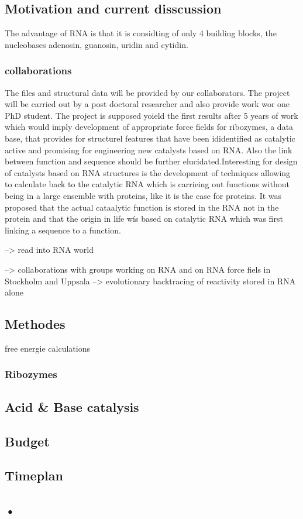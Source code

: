 \documentclass[12pt]{article}
\begin{document}
\subsection{Motivation and current disscussion}
The advantage of RNA is that it is considting of only 4 building blocks, the nucleobases adenosin, guanosin, uridin and cytidin.
\subsubsection{collaborations} 
The files and structural data will be provided by our collaborators. The project will be carried out by a post doctoral researcher and also provide work wor one PhD student. The project is supposed yoield the first results after 5 years of work which would imply development of appropriate force fields for ribozymes, a data base, that provides for structurel features that have been ididentified as catalytic active and promising for engineering new catalysts based on RNA. Also the link between function and sequence should be further elucidated.Interesting for design of catalysts based on RNA structures is the development of techniques allowing to calculate back to the catalytic RNA which is carrieing out functions without being in a large ensemble with proteins, like it is the case for proteins. It was proposed that the actual cataalytic function is stored in the RNA not in the protein and that the origin in life wís based on catalytic RNA which was first linking a sequence to a function.

--> read into RNA world

--> collaborations with groups working on RNA and on RNA force fiels in Stockholm and Uppsala
--> evolutionary backtracing of reactivity stored in RNA alone 
\subsection{Methodes}
free energie calculations 

\subsubsection{Ribozymes}

\subsection{Acid & Base catalysis}

\subsection{Budget}

\subsection{Timeplan}

\subsection{•}
\end{document}
